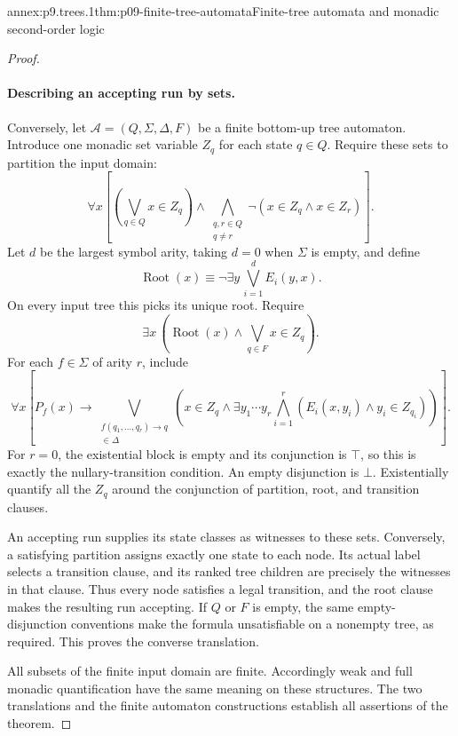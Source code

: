 \begin{annexitem}{annex:p9.trees.1}{thm:p09-finite-tree-automata}{Finite-tree automata and monadic second-order logic}
\begin{proof}
\paragraph{Describing an accepting run by sets.}
Conversely, let \(\mathcal A=(Q,\Sigma,\Delta,F)\) be a finite
bottom-up tree automaton.
Introduce one monadic set variable \(Z_q\) for each state \(q\in Q\).
Require these sets to partition the input domain:
\[
 \forall x\left[
  \left(\bigvee_{q\in Q}x\in Z_q\right)
  \land
  \bigwedge_{\substack{q,r\in Q\\q\ne r}}
                 \neg(x\in Z_q\land x\in Z_r)
 \right].
\]
Let \(d\) be the largest symbol arity, taking \(d=0\) when
\(\Sigma\) is empty, and define
\[
 \operatorname{Root}(x)
   \equiv\neg\exists y\,\bigvee_{i=1}^{d}E_i(y,x).
\]
On every input tree this picks its unique root.
Require
\[
 \exists x\,
       \left(\operatorname{Root}(x)\land
                         \bigvee_{q\in F}x\in Z_q\right).
\]
For each \(f\in\Sigma\) of arity \(r\), include
\[
 \forall x\left[
 P_f(x)\to
 \bigvee_{\substack{f(q_1,\ldots,q_r)\to q\\\in\Delta}}
 \left(
  x\in Z_q\land
  \exists y_1\cdots y_r
       \bigwedge_{i=1}^{r}
                    (E_i(x,y_i)\land y_i\in Z_{q_i})
 \right)\right].
\]
For \(r=0\), the existential block is empty and its conjunction is
\(\top\), so this is exactly the nullary-transition condition.
An empty disjunction is \(\bot\).
Existentially quantify all the \(Z_q\) around the conjunction of
partition, root, and transition clauses.

An accepting run supplies its state classes as witnesses to these sets.
Conversely, a satisfying partition assigns exactly one state to each
node.  Its actual label selects a transition clause, and its ranked
tree children are precisely the witnesses in that clause.
Thus every node satisfies a legal transition, and the root clause
makes the resulting run accepting.
If \(Q\) or \(F\) is empty, the same empty-disjunction conventions
make the formula unsatisfiable on a nonempty tree, as required.
This proves the converse translation.

All subsets of the finite input domain are finite.
Accordingly weak and full monadic quantification have the same
meaning on these structures.  The two translations and the finite
automaton constructions establish all assertions of the theorem.
\end{proof}
\end{annexitem}
